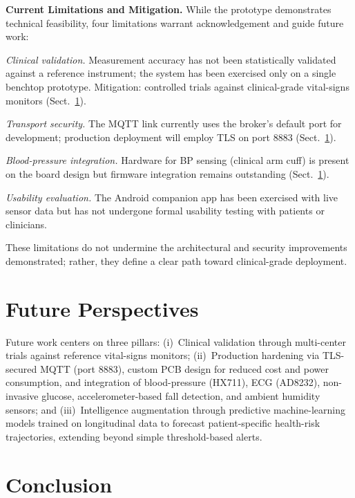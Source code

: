 \documentclass[pdflatex,sn-mathphys-num]{sn-jnl}
\begin{document}
\noindent\textbf{Current Limitations and Mitigation.} While the
prototype demonstrates technical feasibility, four limitations
warrant acknowledgement and guide future work:

\noindent\textit{Clinical validation.} Measurement accuracy has not
been statistically validated against a reference instrument; the
system has been exercised only on a single benchtop prototype.
Mitigation: controlled trials against clinical-grade vital-signs
monitors (Sect.~\ref{sec:future}).

\noindent\textit{Transport security.} The MQTT link currently uses
the broker's default port for development; production deployment
will employ TLS on port 8883 (Sect.~\ref{sec:future}).

\noindent\textit{Blood-pressure integration.} Hardware for BP
sensing (clinical arm cuff) is present on the board design but
firmware integration remains outstanding (Sect.~\ref{sec:future}).

\noindent\textit{Usability evaluation.} The Android companion app
has been exercised with live sensor data but has not undergone
formal usability testing with patients or clinicians.

These limitations do not undermine the architectural and security
improvements demonstrated; rather, they define a clear path toward
clinical-grade deployment.

\section{Future Perspectives}\label{sec:future}

Future work centers on three pillars: (i)~Clinical validation through
multi-center trials against reference vital-signs monitors;
(ii)~Production hardening via TLS-secured MQTT (port 8883), custom
PCB design for reduced cost and power consumption, and integration of
blood-pressure (HX711), ECG (AD8232), non-invasive glucose,
accelerometer-based fall detection, and ambient humidity sensors; and
(iii)~Intelligence augmentation through predictive machine-learning
models trained on longitudinal data to forecast patient-specific
health-risk trajectories, extending beyond simple threshold-based
alerts.

\section{Conclusion}\label{sec:conclusion}
\end{document}
